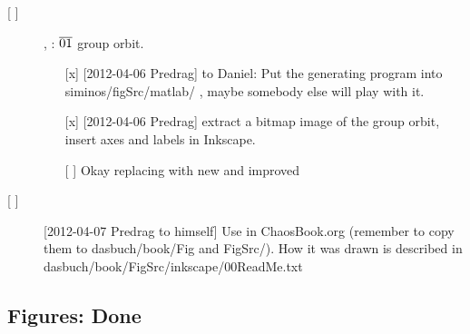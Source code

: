 \begin{description}
\item[{[ ]}] , \CLf: $\overline{01}$ {\rpo} group orbit.
    \begin{itemize}
        \item[{[x]}]  [2012-04-06 Predrag] to Daniel:
            Put the generating program into siminos/figSrc/matlab/ , maybe
            somebody else will play with it.
        \item[{[x]}]  [2012-04-06 Predrag] extract a bitmap image of the
            group orbit, insert axes and labels in Inkscape.
        \item[{[ ]}] Okay replacing  with new and
            improved 
		\end{itemize}

													
\item[{[ ]}] [2012-04-07 Predrag to himself]                               \toCB
Use  in ChaosBook.org (remember to copy them to
dasbuch/book/Fig and FigSrc/). How it was drawn is described in
dasbuch/book/FigSrc/inkscape/00ReadMe.txt

\end{description}

\subsection{Figures: Done}
\label{s:figsDone}


